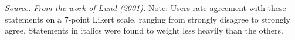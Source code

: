 \textit{Source: From the work of Lund (2001).}
Note: Users rate agreement with these statements on a 7-point Likert
scale, ranging from strongly disagree to strongly agree. Statements in
italics were found to weight less heavily than the others.





